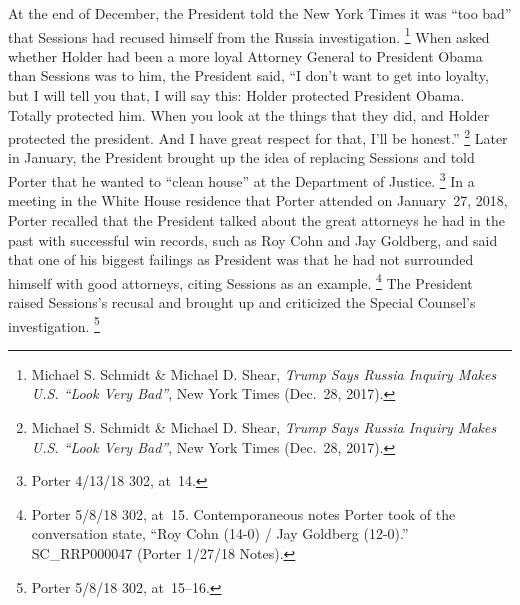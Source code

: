 At the end of December, the President told the New York Times it was ``too bad'' that Sessions had recused himself from the Russia investigation.%
\footnote{Michael S. Schmidt \& Michael D. Shear, \textit{Trump Says Russia Inquiry Makes U.S. ``Look Very Bad''}, New York Times (Dec.~28, 2017).}
When asked whether Holder had been a more loyal Attorney General to President Obama than Sessions was to him, the President said, ``I don't want to get into loyalty, but I will tell you that, I will say this: Holder protected President Obama.
Totally protected him.
When you look at the things that they did, and Holder protected the president.
And I have great respect for that, I'll be honest.''%
\footnote{Michael S. Schmidt \& Michael D. Shear, \textit{Trump Says Russia Inquiry Makes U.S. ``Look Very Bad''}, New York Times (Dec.~28, 2017).}
Later in January, the President brought up the idea of replacing Sessions and told Porter that he wanted to ``clean house'' at the Department of Justice.%
\footnote{Porter 4/13/18 302, at~14.}
In a meeting in the White House residence that Porter attended on January~27, 2018, Porter recalled that the President talked about the great attorneys he had in the past with successful win records, such as Roy Cohn and Jay Goldberg, and said that one of his biggest failings as President was that he had not surrounded himself with good attorneys, citing Sessions as an example.%
\footnote{Porter 5/8/18 302, at~15.
Contemporaneous notes Porter took of the conversation state, ``Roy Cohn (14-0) / Jay Goldberg (12-0).''
SC\_RRP000047 (Porter 1/27/18 Notes).}
The President raised Sessions's recusal and brought up and criticized the Special Counsel's investigation.%
\footnote{Porter 5/8/18 302, at~15--16.}

